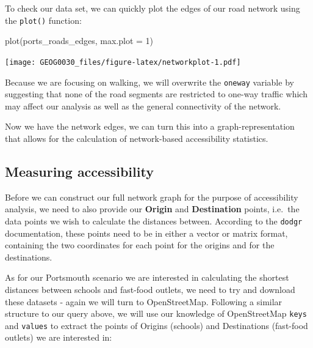 \documentclass[
]{book}
\newenvironment{Shaded}{\begin{snugshade}}{\end{snugshade}}
\newcommand{\AttributeTok}[1]{\textcolor[rgb]{0.77,0.63,0.00}{#1}}
\newcommand{\CommentTok}[1]{\textcolor[rgb]{0.56,0.35,0.01}{\textit{#1}}}
\newcommand{\DecValTok}[1]{\textcolor[rgb]{0.00,0.00,0.81}{#1}}
\newcommand{\FunctionTok}[1]{\textcolor[rgb]{0.00,0.00,0.00}{#1}}
\newcommand{\NormalTok}[1]{#1}
\newcommand{\OtherTok}[1]{\textcolor[rgb]{0.56,0.35,0.01}{#1}}
\newcommand{\SpecialCharTok}[1]{\textcolor[rgb]{0.00,0.00,0.00}{#1}}
\newcommand{\StringTok}[1]{\textcolor[rgb]{0.31,0.60,0.02}{#1}}
\begin{document}
To check our data set, we can quickly plot the edges of our road network using the \texttt{plot()} function:

\begin{Shaded}
\begin{Highlighting}[]
\FunctionTok{plot}\NormalTok{(ports\_roads\_edges, }\AttributeTok{max.plot =} \DecValTok{1}\NormalTok{)}
\end{Highlighting}
\end{Shaded}

\texttt{[image: GEOG0030\_files/figure-latex/networkplot-1.pdf]}

Because we are focusing on walking, we will overwrite the \texttt{oneway} variable by suggesting that none of the road segments are restricted to one-way traffic which may affect our analysis as well as the general connectivity of the network.

\begin{Shaded}
\end{Shaded}

Now we have the network edges, we can turn this into a graph-representation that allows for the calculation of network-based accessibility statistics.

\hypertarget{measuring-accessibility}{%
\subsection{Measuring accessibility}\label{measuring-accessibility}}

Before we can construct our full network graph for the purpose of accessibility analysis, we need to also provide our \textbf{Origin} and \textbf{Destination} points, i.e.~the data points we wish to calculate the distances between. According to the \texttt{dodgr} documentation, these points need to be in either a vector or matrix format, containing the two coordinates for each point for the origins and for the destinations.

As for our Portsmouth scenario we are interested in calculating the shortest distances between schools and fast-food outlets, we need to try and download these datasets - again we will turn to OpenStreetMap. Following a similar structure to our query above, we will use our knowledge of OpenStreetMap \texttt{keys} and \texttt{values} to extract the points of Origins (schools) and Destinations (fast-food outlets) we are interested in:
\end{document}
